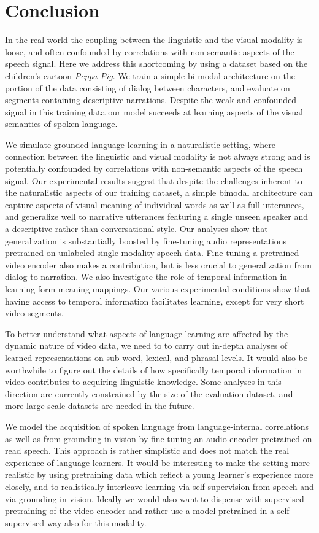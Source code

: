 \section{Conclusion}
\label{sec:conclusion}
In the real world
  the coupling between the linguistic and the visual modality is
  loose, and often confounded by correlations with non-semantic
  aspects of the speech signal. Here we address this shortcoming by
  using a dataset based on the children's cartoon {\it Peppa Pig}.  We
  train a simple bi-modal architecture on the portion of the data
  consisting of dialog between characters, and evaluate on segments
  containing descriptive narrations. Despite the weak and confounded
  signal in this training data our model succeeds at learning aspects
  of the visual semantics of spoken language.
  
We simulate grounded language learning in a naturalistic setting, where 
connection between the linguistic and visual modality is not always strong 
and is potentially confounded by correlations with non-semantic aspects of 
the speech signal. Our experimental results suggest that despite the 
challenges inherent to the naturalistic aspects of our training dataset, a 
simple bimodal architecture can capture aspects of visual meaning of individual 
words as well as full utterances, and generalize well to narrative utterances
featuring a single unseen speaker and a descriptive rather than
conversational style. Our analyses show that generalization is substantially
boosted by fine-tuning audio representations pretrained on unlabeled
single-modality speech data. Fine-tuning a pretrained video encoder
also makes a contribution, but is less crucial to generalization from
dialog to narration.
%
We also investigate the role of temporal information in learning form-meaning 
mappings. Our various experimental conditions show that having access to 
temporal information facilitates learning, except for very short video segments. 

To better understand what aspects of language learning are affected by 
the dynamic nature of video data, we need to to carry out in-depth analyses of learned 
representations on sub-word, lexical, and phrasal levels. It would also be 
worthwhile to figure out the details of how specifically temporal information 
in video contributes to acquiring linguistic knowledge.  Some analyses in 
this direction are currently constrained by the size of the evaluation 
dataset, and more large-scale datasets are needed in the future.

We model the acquisition of spoken language from 
language-internal correlations as well as from grounding in vision 
by fine-tuning an audio encoder pretrained on read speech. This 
approach is rather simplistic and does not match the real experience of 
language learners. It would be interesting to make the setting
more realistic by using pretraining data which reflect a young
learner's experience more closely, and to realistically interleave learning via
self-supervision from speech and via grounding in vision.
Ideally we would also want to dispense with supervised pretraining of 
the video encoder and rather use a model pretrained in a
self-supervised way also for this modality.

